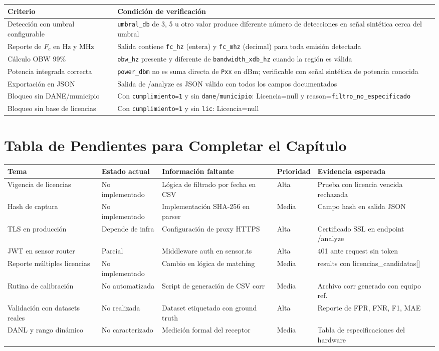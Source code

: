 \begin{tabular}{p{5cm}p{8cm}}
\textbf{Criterio} & \textbf{Condición de verificación} \\
\hline
Detección con umbral configurable & \texttt{umbral\_db} de 3, 5 u otro valor produce diferente número de detecciones en señal sintética cerca del umbral \\
Reporte de $F_c$ en Hz y MHz & Salida contiene \texttt{fc\_hz} (entera) y \texttt{fc\_mhz} (decimal) para toda emisión detectada \\
Cálculo OBW 99\% & \texttt{obw\_hz} presente y diferente de \texttt{bandwidth\_xdb\_hz} cuando la región es válida \\
Potencia integrada correcta & \texttt{power\_dbm} no es suma directa de \texttt{Pxx} en dBm; verificable con señal sintética de potencia conocida \\
Exportación en JSON & Salida de /analyze es JSON válido con todos los campos documentados \\
Bloqueo sin DANE/municipio & Con \texttt{cumplimiento=1} y sin \texttt{dane}/\texttt{municipio}: Licencia=null y reason=\texttt{filtro\_no\_especificado} \\
Bloqueo sin base de licencias & Con \texttt{cumplimiento=1} y sin \texttt{lic}: Licencia=null \\
\end{tabular}

\section{Tabla de Pendientes para Completar el Capítulo}

\begin{tabular}{p{4cm}p{4cm}p{5cm}p{2cm}p{4cm}}
\textbf{Tema} & \textbf{Estado actual} & \textbf{Información faltante} & \textbf{Prioridad} & \textbf{Evidencia esperada} \\
\hline
Vigencia de licencias & No implementado & Lógica de filtrado por fecha en CSV & Alta & Prueba con licencia vencida rechazada \\
Hash de captura & No implementado & Implementación SHA-256 en parser & Media & Campo hash en salida JSON \\
TLS en producción & Depende de infra & Configuración de proxy HTTPS & Alta & Certificado SSL en endpoint /analyze \\
JWT en sensor router & Parcial & Middleware auth en sensor.ts & Alta & 401 ante request sin token \\
Reporte múltiples licencias & No implementado & Cambio en lógica de matching & Media & results con licencias\_candidatas[] \\
Rutina de calibración & No automatizada & Script de generación de CSV corr & Media & Archivo corr generado con equipo ref. \\
Validación con datasets reales & No realizada & Dataset etiquetado con ground truth & Alta & Reporte de FPR, FNR, F1, MAE \\
DANL y rango dinámico & No caracterizado & Medición formal del receptor & Media & Tabla de especificaciones del hardware \\
\end{tabular}


